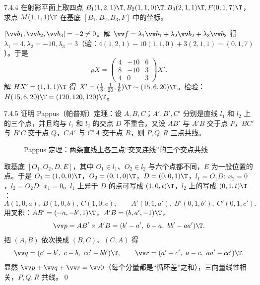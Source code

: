 \begin{ex}{7.4.4}
在射影平面上取四点 $B_1(1,2,1)\T,B_2(1,1,0)\T,B_3(2,1,1)\T,F(0,1,7)\T$，求点 $M(1,1,1)\T$ 在基底 $[B_1,B_2,B_3,F]$ 中的坐标。
\end{ex}
\jie $|\vv b_1,\vv b_2,\vv b_3|=-2\neq0$。解 $\vv f=\lambda_1\vv b_1+\lambda_2\vv b_2+\lambda_3\vv b_3$ 得 $\lambda_1=4,\lambda_2=-10,\lambda_3=3$（验：$4(1,2,1)-10(1,1,0)+3(2,1,1)=(0,1,7)$）。于是
\[
\rho X=\begin{pmatrix}4&-10&6\\8&-10&3\\4&0&3\end{pmatrix}X' .
\]
解 $HX'=(1,1,1)\T$ 得 $X'=(\frac18,\frac1{20},\frac16)\T\sim(15,6,20)\T$。检验：$H(15,6,20)\T=(120,120,120)\T$。\checkmark

\begin{ex}{7.4.5}
证明 Pappus（帕普斯）定理：设 $A,B,C$；$A',B',C'$ 分别是直线 $l_1$ 和 $l_2$ 上的三个点，并且均与 $l_1$ 和 $l_2$ 的交点 $D$ 不重合，又设 $AB'$ 与 $A'B$ 交于点 $P$，$BC'$ 与 $B'C$ 交于点 $Q$，$CA'$ 与 $C'A$ 交于点 $R$，则 $P,Q,R$ 三点共线。
\end{ex}

\begin{figure}[htbp]
\centering
{}
\caption{Pappus 定理：两条直线上各三点“交叉连线”的三个交点共线}
\end{figure}

\zheng 取基底 $[O_1,O_2,D,E]$，其中 $O_1\in l_1$、$O_2\in l_2$ 与六个点都不同，$E$ 为一般位置的点。于是 $O_1=(1,0,0)\T$，$O_2=(0,1,0)\T$，$D=(0,0,1)\T$，$l_1=O_1D:\ x_2=0$，$l_2=O_2D:\ x_1=0$。$l_1$ 上异于 $D$ 的点可写成 $(1,0,t)\T$，$l_2$ 上的写成 $(0,1,t)\T$：
\[
A(1,0,a),\ B(1,0,b),\ C(1,0,c);\qquad A'(0,1,a'),\ B'(0,1,b'),\ C'(0,1,c').
\]
用叉积：$AB'=(-a,-b',1)\T$，$A'B=(b,a',-1)\T$，
\[
\vv p=AB'\times A'B=(b'-a',\ b-a,\ bb'-aa')\T .
\]
把 $(A,B)$ 依次换成 $(B,C)$、$(C,A)$ 得
\[
\vv q=(c'-b',\ c-b,\ cc'-bb')\T,\qquad \vv r=(a'-c',\ a-c,\ aa'-cc')\T .
\]
显然 $\vv p+\vv q+\vv r=\vv0$（每个分量都是“循环差”之和），三向量线性相关，$P,Q,R$ 共线。\qed

